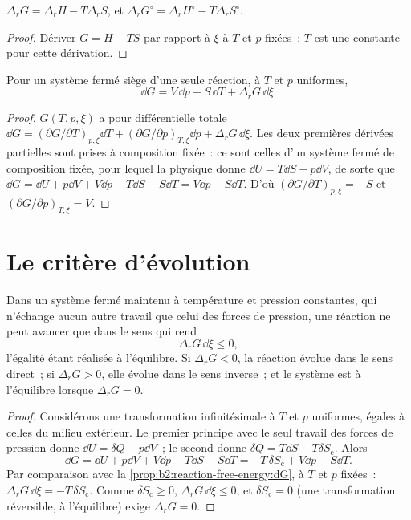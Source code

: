 \begin{proposition}\label{prop:b2:reaction-free-energy:g-h-s}
$\Delta_r G = \Delta_r H - T\Delta_r S$, et $\Delta_r G^\circ = \Delta_r
H^\circ - T\Delta_r S^\circ$.
\end{proposition}

\begin{proof}
Dériver $G = H - TS$ par rapport à $\xi$ à $T$ et $p$ fixées~: $T$
est une constante pour cette dérivation.
\end{proof}

\begin{proposition}\label{prop:b2:reaction-free-energy:dG}
Pour un système fermé siège d'une seule réaction, à $T$ et
$p$ uniformes,
\[
  \dd G = V\,\dd p - S\,\dd T + \Delta_r G\,\dd\xi .
\]
\end{proposition}

\begin{proof}
$G(T, p, \xi)$ a pour différentielle totale $\dd G = (\partial G/\partial
T)_{p,\xi}\dd T + (\partial G/\partial p)_{T,\xi}\dd p + \Delta_r G\,\dd\xi$.
Les deux premières dérivées partielles sont prises à composition fixée~: ce sont
celles d'un système fermé de composition fixée, pour lequel la physique donne
$\dd U = T\dd S - p\dd V$, de sorte que $\dd G = \dd U + p\dd V + V\dd p - T\dd S
- S\dd T = V\dd p - S\dd T$. D'où $(\partial G/\partial T)_{p,\xi} = -S$
et $(\partial G/\partial p)_{T,\xi} = V$.
\end{proof}

\section{Le critère d'évolution}

\begin{theorem}\label{thm:b2:reaction-free-energy:evolution}
Dans un système fermé maintenu à température et pression constantes, qui n'échange aucun
autre travail que celui des forces de pression, une réaction ne peut avancer que dans
le sens qui rend
\[
  \Delta_r G\,\dd\xi \leq 0 ,
\]
l'égalité étant réalisée à l'équilibre. Si $\Delta_r G < 0$, la réaction évolue dans le
sens direct~; si $\Delta_r G > 0$, elle évolue dans le sens inverse~; et le système est à
l'équilibre lorsque $\Delta_r G = 0$.
\end{theorem}

\begin{proof}
Considérons une transformation infinitésimale à $T$ et $p$ uniformes, égales à celles du
milieu extérieur. Le premier principe avec le seul travail des forces de pression donne $\dd U = \delta Q
- p\dd V$~; le second donne $\delta Q = T\dd S - T\delta S_{\text{c}}$. Alors
\[
  \dd G = \dd U + p\dd V + V\dd p - T\dd S - S\dd T = -T\,\delta
  S_{\text{c}} + V\dd p - S\dd T .
\]
Par comparaison avec la \cref{prop:b2:reaction-free-energy:dG}, à $T$ et $p$ fixées~:
$\Delta_r G\,\dd\xi = -T\,\delta S_{\text{c}}$. Comme $\delta S_{\text{c}}
\geq 0$, $\Delta_r G\,\dd\xi \leq 0$, et $\delta S_{\text{c}} = 0$ (une
transformation réversible, à l'équilibre) exige $\Delta_r G = 0$.
\end{proof}

